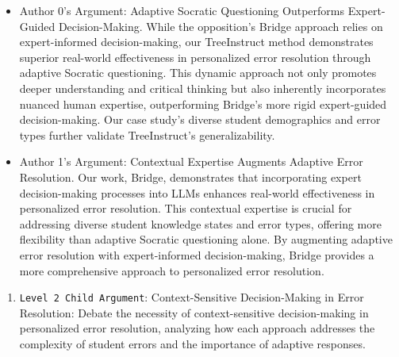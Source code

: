 \begin{enumerate}
\begin{enumerate}
        \begin{itemize}
            \item Author 0's Argument: Adaptive Socratic Questioning Outperforms Expert-Guided Decision-Making. While the opposition's Bridge approach relies on expert-informed decision-making, our TreeInstruct method demonstrates superior real-world effectiveness in personalized error resolution through adaptive Socratic questioning. This dynamic approach not only promotes deeper understanding and critical thinking but also inherently incorporates nuanced human expertise, outperforming Bridge's more rigid expert-guided decision-making. Our case study's diverse student demographics and error types further validate TreeInstruct's generalizability.
		\item Author 1's Argument: Contextual Expertise Augments Adaptive Error Resolution. Our work, Bridge, demonstrates that incorporating expert decision-making processes into LLMs enhances real-world effectiveness in personalized error resolution. This contextual expertise is crucial for addressing diverse student knowledge states and error types, offering more flexibility than adaptive Socratic questioning alone. By augmenting adaptive error resolution with expert-informed decision-making, Bridge provides a more comprehensive approach to personalized error resolution.
        \end{itemize}
    \end{enumerate}

    \begin{enumerate}
        \item \texttt{Level 2 Child Argument}: Context-Sensitive Decision-Making in Error Resolution: Debate the necessity of context-sensitive decision-making in personalized error resolution, analyzing how each approach addresses the complexity of student errors and the importance of adaptive responses.


\end{enumerate}
\end{enumerate}
